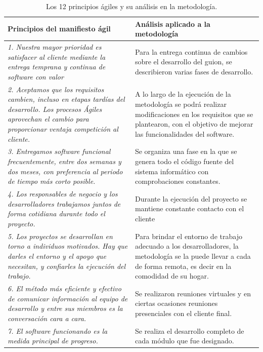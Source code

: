 \begin{table}[h!]
	\caption{Los 12 principios ágiles y su análisis en la metodología.}
	\label{tab:analisis_principios}
	\begin{tabular}{p{7cm}p{7cm}}
		\toprule
		\textbf{Principios del manifiesto ági}l & \textbf{Análisis aplicado a la metodología} \\
		\midrule
		\textit{1. Nuestra mayor prioridad es satisfacer al cliente mediante la entrega temprana y continua de software con valor}  & Para la entrega continua de cambios sobre el desarrollo del guion, se describieron varias fases de desarrollo. \\
		\addlinespace
		\textit{2. Aceptamos que los requisitos cambien, incluso en etapas tardías del desarrollo. Los procesos Ágiles aprovechan el cambio para proporcionar ventaja competición al cliente.}   & A lo largo de la ejecución de la metodología se podrá realizar modificaciones en los requisitos que se plantearon, con el objetivo de mejorar las funcionalidades del software. \\
		\addlinespace
		\textit{3. Entregamos software funcional frecuentemente, entre dos semanas y dos meses, con preferencia al periodo de tiempo más corto posible.}   & Se organiza una fase en la que se genera todo el código fuente del sistema informático con comprobaciones constantes. \\
		\addlinespace
		\textit{4. Los responsables de negocio y los desarrolladores trabajamos juntos de forma cotidiana durante todo el proyecto.}   & Durante la ejecución del proyecto se mantiene constante contacto con el cliente \\
		\addlinespace
		\textit{5. Los proyectos se desarrollan en torno a individuos motivados. Hay que darles el entorno y el apoyo que necesitan, y confiarles la ejecución del trabajo.}   & Para brindar el entorno de trabajo adecuado a los desarrolladores, la metodología se la puede llevar a cada de forma remota, es decir en la comodidad de su hogar. \\
		\addlinespace
		\textit{6. El método más eficiente y efectivo de comunicar información al equipo de desarrollo y entre sus miembros es la conversación cara a cara.}  & Se realizaron reuniones virtuales y en ciertas ocasiones reuniones presenciales con el cliente final. \\
		\addlinespace
		\textit{7. El software funcionando es la medida principal de progreso.}  & Se realiza el desarrollo completo de cada módulo que fue designado. \\

\end{tabular}
\end{table}
